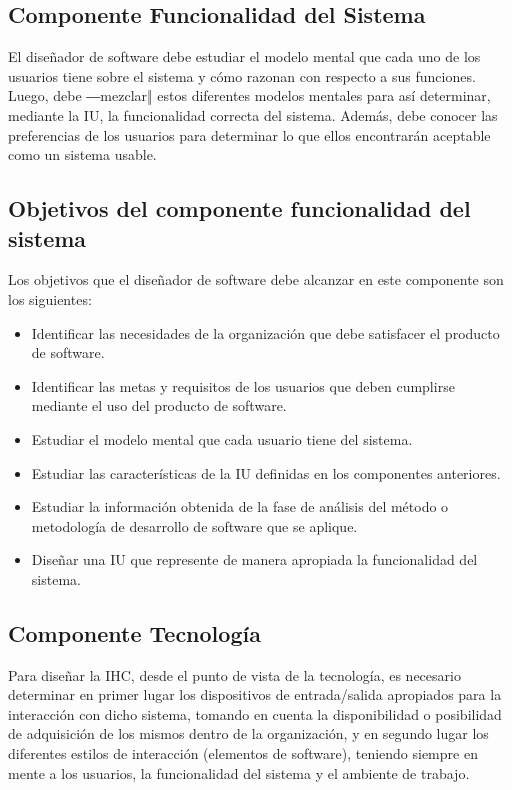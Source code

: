 \documentclass[11pt]{article}
\begin{document}
\subsection{Componente Funcionalidad del Sistema}
\label{sec:org7f64201}
\autocite{narciso_valero_2008} El diseñador de software debe estudiar el 
modelo mental que cada uno de los usuarios tiene sobre el sistema y cómo 
razonan con respecto a sus funciones. Luego, debe ―mezclar‖ estos diferentes 
modelos mentales para así determinar, mediante la IU, la funcionalidad correcta 
del sistema. Además, debe conocer las preferencias de los usuarios para 
determinar lo que ellos encontrarán aceptable como un sistema usable.

\subsection{Objetivos del componente funcionalidad del sistema}
\label{sec:org0351ac2}
\autocite{narciso_valero_2008} Los objetivos que el diseñador de software
debe alcanzar en este componente son los siguientes: 

\begin{itemize}
\item Identificar las necesidades de la organización que debe satisfacer el producto de software.
\item Identificar las metas y requisitos de los usuarios que deben cumplirse mediante el uso del producto de software.
\item Estudiar el modelo mental que cada usuario tiene del sistema.
\item Estudiar las características de la IU definidas en los componentes anteriores.
\item Estudiar la información obtenida de la fase de análisis del método o metodología de desarrollo de software que se aplique.
\item Diseñar una IU que represente de manera apropiada la funcionalidad del sistema.
\end{itemize}


\subsection{Componente Tecnología}
\label{sec:orgcfc11d5}
\autocite{narciso_valero_2008} Para diseñar la IHC, desde el punto de 
vista de la tecnología, es necesario determinar en primer lugar los 
dispositivos de entrada/salida apropiados para la interacción con dicho 
sistema, tomando en cuenta la disponibilidad o posibilidad de adquisición de 
los mismos dentro de la organización, y en segundo lugar los diferentes estilos
de interacción (elementos de software), teniendo siempre en mente a los 
usuarios, la funcionalidad del sistema y el ambiente de trabajo. 
\end{document}
